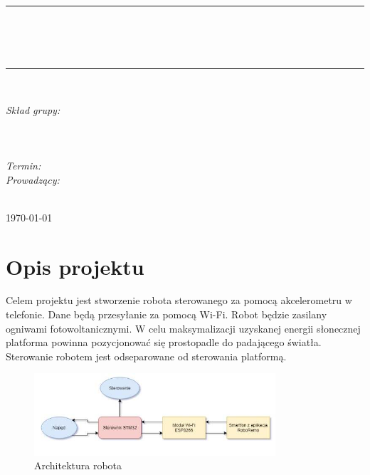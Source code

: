 \documentclass[10pt, a4paper]{article}
\begin{document}
\def\tablename{Tabela}	%

\begin{titlepage}
	\begin{center}
		\textsc{\LARGE \formakursu}\\[1cm]		
		\textsc{\Large \kurs}\\[0.5cm]		
		\rule{\textwidth}{0.08cm}\\[0.4cm]
		{\huge \bfseries \doctype}\\[1cm]
		{\huge \bfseries \projectname}\\[0.5cm]
		\rule{\textwidth}{0.08cm}\\[1cm]
		
		\begin{flushright} \large
		\emph{Skład grupy:}\\
		\osobaA\\
		\osobaB\\
		\osobaC\\[0.4cm]
		
		\emph{Termin: }\termin\\[0.4cm]

		\emph{Prowadzący:} \\
		\prowadzacy \\
		
		\end{flushright}
		
		\vfill
		
		{\large \today}
	\end{center}	
\end{titlepage}

\newpage
\tableofcontents
\newpage

\section{Opis projektu}
Celem projektu jest stworzenie robota sterowanego za pomocą akcelerometru w telefonie. Dane będą przesyłanie za pomocą Wi-Fi. Robot będzie zasilany ogniwami fotowoltanicznymi. W celu maksymalizacji uzyskanej energii słonecznej platforma powinna pozycjonować się prostopadle do padającego światła. Sterowanie robotem jest odseparowane od sterowania platformą.

	\begin{figure}[H]
		\centering
		\includegraphics[width=0.8\textwidth]{diag1.jpg}
		\caption{Architektura robota}
		\label{fig:Architektura robota}
	\end{figure}
\end{document}
